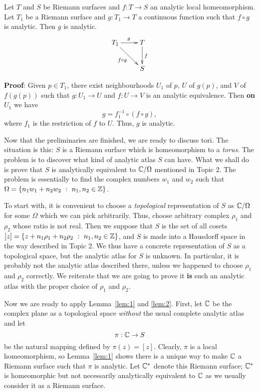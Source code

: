 \documentclass[a4paper,11pt]{article}
\begin{document}
\begin{lem}
  \label{lem:2}
  Let $T$ and $S$ be Riemann surfaces and $f : T \to S$ an analytic
  local homeomorphism.  Let $T_1$ be a Riemann surface and $g : T_1
  \to T$ a continuous function such that $f \circ g$ is analytic.
  Then $g$ is analytic.
  $$
  \xymatrix{
    T_1 \ar[r]^g \ar[dr]_{f\circ g} & T \ar[d]^f\\
    & S
    }
  $$
\end{lem}

\begin{mdframed}
  \textbf{Proof}:
  Given $p \in T_1$, there exist neighbourhoods $U_1$ of $p$, $U$ of
  $g(p)$, and  $V$ of $f(g(p))$ such that $g : U_1 \to U$ and $f : U
  \to V$ is an analytic equivalence.  Then \textbf{on $U_1$} we have
  $$
  g = f_1^{-1} \circ (f \circ g),
  $$
  where $f_1$ is the restriction of $f$ to $U$.  Thus, $g$ is
  analytic.
\end{mdframed}

\medskip
Now that the preliminaries are finished, we are ready to discuss
tori.  The situation is this: $S$ is a Riemann surface which is
homeomorphism to a \emph{torus}.
The problem is to discover what kind of analytic atlas $S$ can have.
What we shall do is prove that $S$ is analytically equivalent to ${\mathbb C}
/ \Omega$ mentioned in Topic 2.  The problem is essentially to find
the complex numbers $w_1$ and $w_2$ such that $\Omega = \{ n_1 w_1 +
n_2 w_2 ~:~ n_1, n_2 \in {\mathbb Z}\}$.

To start with, it is convenient to choose a \emph{topological}
representation of $S$ as ${\mathbb C} / \Omega$ for some $\Omega$ which we
can pick arbitrarily.  Thus, choose arbitrary complex $\rho_1$ and
$\rho_2$ whose ratio is not real.  Then we suppose that $S$ is the set
of all cosets $[z] = \{z + n_1 \rho_1 + n_2 \rho_2 ~:~ n_1, n_2 \in
{\mathbb Z}\}$, and $S$ is made into a Hausdorff space in the way described in
Topic 2.  We thus have a concrete representation of $S$ as a
topological space, but the analytic atlas for $S$ is unknown.  In
particular, it is probably not the analytic atlas described there,
unless we happened to choose $\rho_1$ and $\rho_2$ correctly.  We
reiterate that we are going to prove it \textbf{is} such an analytic
atlas with the proper choice of $\rho_1$ and $\rho_2$.

Now we are ready to apply Lemma~\ref{lem:1} and \ref{lem:2}.  First,
let ${\mathbb C}$ be the complex plane as a topological space \emph{without}
the usual complete analytic atlas and let
$$
\pi : {\mathbb C} \to S
$$
be the natural mapping defined by $\pi(z) = [z]$.  Clearly, $\pi$ is a
local homeomorphism, so Lemma~\ref{lem:1} shows there is a
unique way to make ${\mathbb C}$ a Riemann surface such that $\pi$ is
analytic.  Let ${\mathbb C}^*$ denote this Riemann surface; ${\mathbb C}^*$ is
homeomorphic but not necessarily analytically equivalent to ${\mathbb C}$ as
we usually consider it as a Riemann surface.
\end{document}
